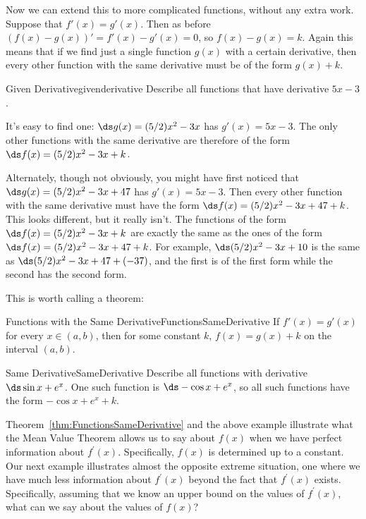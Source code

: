 Now we can extend this to more complicated functions, without any
extra work. Suppose that $f'(x)=g'(x)$. Then as before
$(f(x)-g(x))' = f'(x)-g'(x) =0$, so $f(x)-g(x)=k$. Again this means
that if we find just a single function $g(x)$ with a certain
derivative, then every other function with the same derivative must be
of the form $g(x)+k$.

\begin{example}{Given Derivative}{givenderivative}
Describe all functions that have derivative $5x-3$. 
\end{example}

\begin{solution} 
It's easy to find
one: $\ds g(x)=(5/2)x^2-3x$ has $g'(x)=5x-3$. The only other functions
with the same derivative are therefore of the form
$\ds f(x)=(5/2)x^2-3x+k$.

Alternately, though not obviously, you might have first noticed that 
$\ds g(x)=(5/2)x^2-3x+47$ has $g'(x)=5x-3$. Then every other function
with the same derivative must have the form $\ds f(x)=(5/2)x^2-3x+47+k$.
This looks different, but it really isn't. The functions of the form
$\ds f(x)=(5/2)x^2-3x+k$ are exactly the same as the ones of the form
$\ds f(x)=(5/2)x^2-3x+47+k$. For example, $\ds (5/2)x^2-3x+10$ is the same as
$\ds (5/2)x^2-3x+47+(-37)$, and the first is of the first form while
the second has the second form.
\end{solution}

This is worth calling a theorem:

\begin{theorem}{Functions with the Same Derivative}{FunctionsSameDerivative}
If $f'(x)=g'(x)$ for every $x\in (a,b)$, then for some constant
$k$, $f(x)=g(x)+k$ on the interval $(a,b)$.
\end{theorem} 

\begin{example}{Same Derivative}{SameDerivative}
Describe all functions with derivative $\ds \sin x + e^x$. One such
function is $\ds -\cos x+e^x$, so all such functions have the form
$-\cos x+e^x+k$.
\end{example}

Theorem~\ref{thm:FunctionsSameDerivative} and the above example illustrate what the Mean
Value Theorem allows us to say about $f(x)$ when we have
perfect information about $f^{\prime}(x)$. Specifically, $f(x)$
is determined up to a constant. Our next example
illustrates almost the opposite extreme situation, one where we have much
less information about $f^{\prime}(x)$ beyond the fact that $f^{\prime}(x)$
exists. Specifically, assuming that we know an
upper bound on the values of $f^{\prime}(x)$, what can we say
about the values of $f(x)$?

